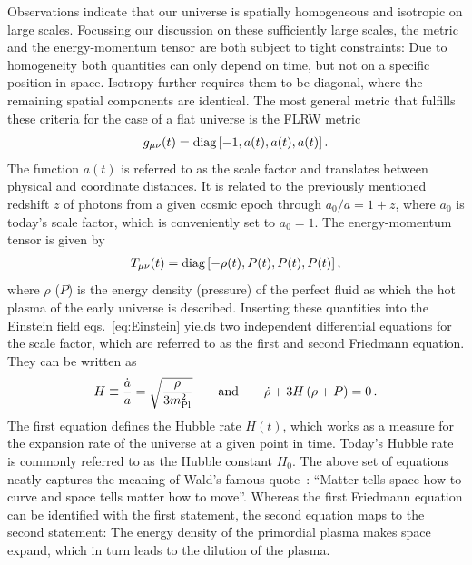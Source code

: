 Observations indicate that our universe is spatially homogeneous and isotropic on large scales. Focussing our discussion on these sufficiently large scales, the metric and the energy-momentum tensor are both subject to tight constraints: Due to homogeneity both quantities can only depend on  time, but not on a specific position in space. Isotropy further requires them to be diagonal, where the remaining spatial components are identical. The most general metric that fulfills these criteria for the case of a flat universe is the \ac{FLRW} metric
\begin{align}
	g_{\mu \nu}(t) = \text{diag} \left[ -1, a(t), a(t), a(t) \right]  .
	\label{eq:FLRWmetric}
\end{align}
The function $a(t)$ is referred to as the scale factor and translates between physical and coordinate distances. It is related to the previously mentioned redshift $z$ of photons from a given cosmic epoch through $a_0 / a = 1 + z$, where $a_0$ is today's scale factor, which is conveniently set to $a_0 = 1$. The energy-momentum tensor is given by
\begin{align}
	T_{\mu \nu}(t) = \text{diag} \left[ -\rho(t), P(t), P(t), P(t) \right] ,
	\label{eq:perffluid}
\end{align}
where $\rho$ ($P$) is the energy density (pressure) of the perfect fluid as which the hot plasma of the early universe is described. Inserting these quantities into the Einstein field eqs.~\eqref{eq:Einstein} yields two independent differential equations for the scale factor, which are referred to as the first and second Friedmann equation. They can be written as
\begin{align}
	H \equiv \frac{\dot{a}}{a} = \sqrt{\frac{\rho}{3  m_\text{Pl}^2}} \quad &&\text{and}&& \quad
	\dot{\rho} + 3 H  \left( \rho + P \right) = 0 \, .
	\label{eq:Friedmann}
\end{align}
The first equation defines the Hubble rate $H(t)$, which works as a measure for the expansion rate of the universe at a given point in time. Today's Hubble rate is commonly referred to as the Hubble constant $H_0$. The above set of equations neatly captures the meaning of Wald's famous quote~\cite{Wald:1984rg}: ``Matter tells space how to curve and space tells matter how to move''. Whereas the first Friedmann equation can be identified with the first statement, the second equation maps to the second statement: The energy density of the primordial plasma makes space expand, which in turn leads to the dilution of the plasma.

